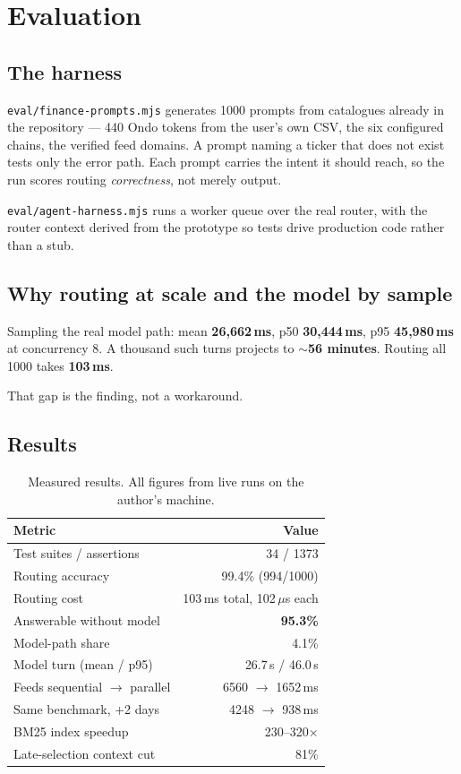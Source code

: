 \documentclass[10pt,twocolumn]{article}
\newcommand{\code}[1]{\texttt{\small #1}}
\begin{document}
\section{Evaluation}
\label{sec:eval}

\subsection{The harness}

\code{eval/finance-prompts.mjs} generates 1000 prompts from catalogues already in the
repository --- 440 Ondo tokens from the user's own CSV, the six configured chains, the
verified feed domains. A prompt naming a ticker that does not exist tests only the error
path. Each prompt carries the intent it should reach, so the run scores routing
\emph{correctness}, not merely output.

\code{eval/agent-harness.mjs} runs a worker queue over the real router, with the router
context derived from the prototype so tests drive production code rather than a stub.

\subsection{Why routing at scale and the model by sample}

Sampling the real model path: mean \textbf{26{,}662\,ms}, p50 \textbf{30{,}444\,ms}, p95
\textbf{45{,}980\,ms} at concurrency 8. A thousand such turns projects to
\textbf{$\sim$56 minutes}. Routing all 1000 takes \textbf{103\,ms}.

That gap is the finding, not a workaround.

\subsection{Results}

\begin{table}[h]
\centering\small
\begin{tabular}{@{}lr@{}}
\toprule
\textbf{Metric} & \textbf{Value} \\
\midrule
Test suites / assertions & 34 / 1373 \\
Routing accuracy & 99.4\% (994/1000) \\
Routing cost & 103\,ms total, 102\,$\mu$s each \\
Answerable without model & \textbf{95.3\%} \\
Model-path share & 4.1\% \\
Model turn (mean / p95) & 26.7\,s / 46.0\,s \\
Feeds sequential $\to$ parallel & 6560 $\to$ 1652\,ms \\
Same benchmark, +2 days & 4248 $\to$ 938\,ms \\
BM25 index speedup & 230--320$\times$ \\
Late-selection context cut & 81\% \\
\bottomrule
\end{tabular}
\caption{Measured results. All figures from live runs on the author's machine.}
\end{table}
\end{document}
